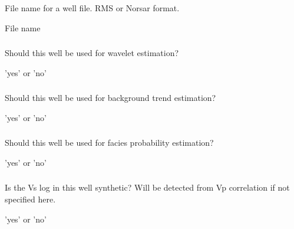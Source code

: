 \subsubsection{}
 \slist
   \item \Description File name for a well file. RMS or Norsar format.
   \item \Argument File name
   \item \Default
 \elist


\subsubsection{}
 \slist
   \item \Description Should this well be used for wavelet estimation?
   \item \Argument 'yes' or 'no'
   \item \Default
 \elist

\subsubsection{}
 \slist
   \item \Description Should this well be used for background trend estimation?
   \item \Argument 'yes' or 'no'
   \item \Default
 \elist

\subsubsection{}
 \slist
   \item \Description Should this well be used for facies probability estimation?
   \item \Argument 'yes' or 'no'
   \item \Default
 \elist

\subsubsection{}
 \slist
   \item \Description Is the Vs log in this well synthetic? Will be detected from Vp correlation if not specified here.
   \item \Argument 'yes' or 'no'
   \item \Default
 \elist

